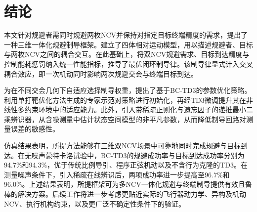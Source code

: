 \section{结论}
本文针对规避者需同时规避两枚NCV并保持对指定目标终端精度的需求，提出了一种三维一体化规避制导框架。建立了四体相对运动模型，用以描述规避者、目标与两枚NCV之间的耦合交互。在此基础上，将双NCV规避需求、目标到达精度与控制能耗惩罚纳入统一性能指标，推导了最优闭环制导律。该制导律显式计入交叉耦合效应，即一次机动同时影响两次规避交会与终端目标到达。

为在不同交会几何下自适应选择制导权重，提出了基于BC-TD3的参数优化策略。利用单打靶优化方法生成的专家示范对策略进行初始化，再经TD3微调提升其在非线性多约束环境中的适应能力。此外，引入带稀疏正则化与遗忘因子的递推最小二乘辨识器，从含噪测量中估计状态空间模型的非平凡参数，从而降低制导回路对测量误差的敏感性。

仿真结果表明，所提方法能够在三维双NCV场景中可靠地同时完成规避与目标到达。在无噪声蒙特卡洛试验中，BC-TD3的规避成功率与目标到达成功率分别为94.7\%和94.3\%，优于传统比例导引、程序正弦机动以及不含行为克隆的TD3。在测量噪声条件下，引入稀疏在线辨识后，两项成功率进一步提高至96.7\%和96.0\%。上述结果表明，所提框架可为多NCV一体化规避与终端制导提供有效且鲁棒的解决方案。后续工作将进一步考虑更贴近实际的飞行器动力学、异构及机动NCV、执行机构约束，以及更广泛不确定性条件下的验证。
